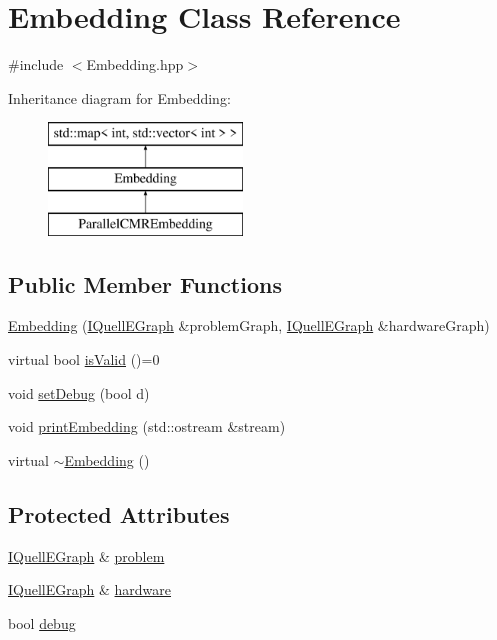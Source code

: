 \hypertarget{a00050}{}\section{Embedding Class Reference}
\label{a00050}


{\ttfamily \#include $<$Embedding.\+hpp$>$}

Inheritance diagram for Embedding\+:\begin{figure}[H]
\begin{center}
\leavevmode
\includegraphics[height=3.000000cm]{a00050}
\end{center}
\end{figure}
\subsection*{Public Member Functions}
\begin{DoxyCompactItemize}
\item 
\hyperlink{a00050_ac59278c6a34aa4811f34779c0500173d}{Embedding} (\hyperlink{a00076}{I\+Quell\+E\+Graph} \&problem\+Graph, \hyperlink{a00076}{I\+Quell\+E\+Graph} \&hardware\+Graph)
\item 
virtual bool \hyperlink{a00050_ab4a56ed9d02ebc5abaae2a7bdfbe5206}{is\+Valid} ()=0
\item 
void \hyperlink{a00050_a3817f8a9fe8deded8c4ba6ff3d239140}{set\+Debug} (bool d)
\item 
void \hyperlink{a00050_a1139883ba65f945053ad8e284ef82746}{print\+Embedding} (std\+::ostream \&stream)
\item 
virtual \hyperlink{a00050_af94a48684f9b7227be2f48dd08584d66}{$\sim$\+Embedding} ()
\end{DoxyCompactItemize}
\subsection*{Protected Attributes}
\begin{DoxyCompactItemize}
\item 
\hyperlink{a00076}{I\+Quell\+E\+Graph} \& \hyperlink{a00050_a0ccb9d65884b3ef699699882b2745af9}{problem}
\item 
\hyperlink{a00076}{I\+Quell\+E\+Graph} \& \hyperlink{a00050_a511a70c0b460d5baad91794dbc60ab09}{hardware}
\item 
bool \hyperlink{a00050_af9fa67f1edc38349bb70e5e78d0f3fbd}{debug}
\end{DoxyCompactItemize}


